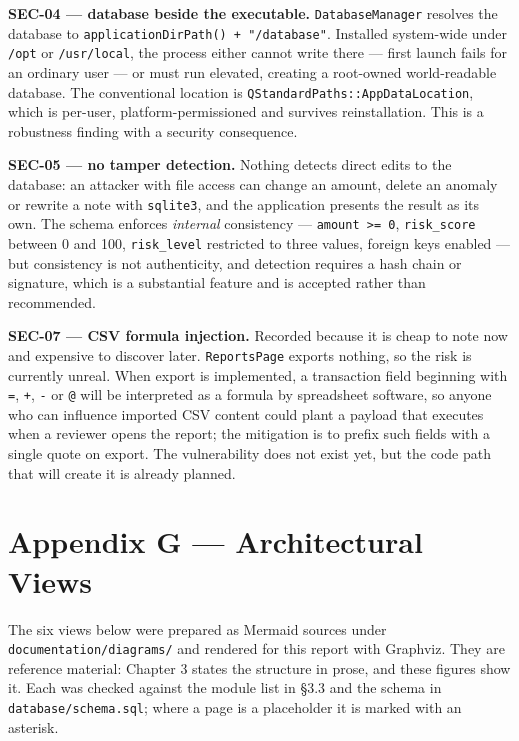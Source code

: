 \documentclass[
  12pt,
]{report}
\begin{document}
\textbf{SEC-04 --- database beside the executable.}
\texttt{DatabaseManager} resolves the database to
\texttt{application\-Dir\-Path()\ +\ "/\allowbreak{}database"}. Installed system-wide
under \texttt{/\allowbreak{}opt} or \texttt{/\allowbreak{}usr/\allowbreak{}local}, the process either cannot
write there --- first launch fails for an ordinary user --- or must run
elevated, creating a root-owned world-readable database. The
conventional location is \texttt{QStandardPaths::AppDataLocation}, which
is per-user, platform-permissioned and survives reinstallation. This is
a robustness finding with a security consequence.

\textbf{SEC-05 --- no tamper detection.} Nothing detects direct edits to
the database: an attacker with file access can change an amount, delete
an anomaly or rewrite a note with \texttt{sqlite3}, and the application
presents the result as its own. The schema enforces \emph{internal}
consistency --- \texttt{amount\ \textgreater{}=\ 0},
\texttt{risk\_score} between 0 and 100, \texttt{risk\_level} restricted
to three values, foreign keys enabled --- but consistency is not
authenticity, and detection requires a hash chain or signature, which is
a substantial feature and is accepted rather than recommended.

\textbf{SEC-07 --- CSV formula injection.} Recorded because it is cheap
to note now and expensive to discover later. \texttt{ReportsPage}
exports nothing, so the risk is currently unreal. When export is
implemented, a transaction field beginning with \texttt{=}, \texttt{+},
\texttt{-} or \texttt{@} will be interpreted as a formula by spreadsheet
software, so anyone who can influence imported CSV content could plant a
payload that executes when a reviewer opens the report; the mitigation
is to prefix such fields with a single quote on export. The
vulnerability does not exist yet, but the code path that will create it
is already planned.

\clearpage

\chapter{Appendix G --- Architectural
Views}\label{appendix-g-architectural-views}

The six views below were prepared as Mermaid sources under
\texttt{documentation/\allowbreak{}diagrams/\allowbreak{}} and rendered for this report with
Graphviz. They are reference material: Chapter 3 states the structure in
prose, and these figures show it. Each was checked against the module
list in §3.3 and the schema in \texttt{database/\allowbreak{}schema.sql}; where a
page is a placeholder it is marked with an asterisk.
\end{document}
